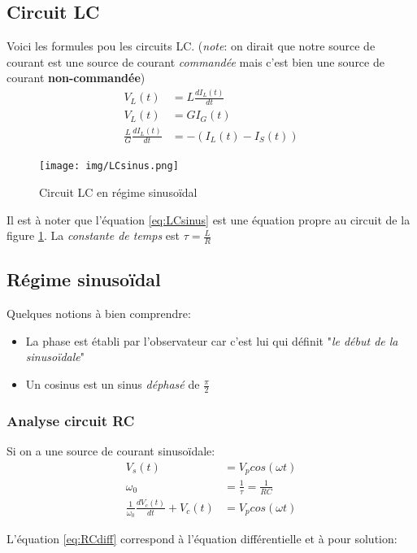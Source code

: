 \documentclass{report}
\begin{document}
\subsection{Circuit LC}
Voici les formules pou les circuits LC. (\textit{note}: on dirait que notre source de courant est une source de courant \textit{commandée} mais c'est bien une source de courant \textbf{non-commandée})
\begin{align}
V_L(t) &= L \frac{dI_L(t)}{dt}\\
V_L(t) &= GI_G(t)\\
\frac{L}{G} \frac{dI_L(t)}{dt} &= -(I_L(t)-I_S(t))\label{eq:LCsinus}
\end{align}

\begin{figure}[H]
\centering
\texttt{[image: img/LCsinus.png]} \label{img:LCsinus}
\caption{Circuit LC en régime sinusoïdal}
\end{figure}

Il est à noter que l'équation \ref{eq:LCsinus} est une équation propre au circuit de la figure \ref{img:LCsinus}. La \textit{constante de temps} est $\tau = \frac{L}{R}$

\subsection{Régime sinusoïdal}
Quelques notions à bien comprendre:
\begin{itemize}
\item La phase est établi par l'observateur car c'est lui qui définit "\textit{le début de la sinusoïdale}"
\item Un cosinus est un sinus \textit{déphasé} de $\frac{\pi}{2}$
\end{itemize}

\subsubsection{Analyse circuit RC}
Si on a une source de courant sinusoïdale:
\begin{align}
V_s(t) &= V_p cos(\omega t)\\
\omega_0 &= \frac{1}{\tau} = \frac{1}{RC}\\
\frac{1}{\omega_0}\frac{dV_c(t)}{dt} + V_c(t) &= V_p cos(\omega t) \label{eq:RCdiff}
\end{align}

L'équation \ref{eq:RCdiff} correspond à l'équation différentielle et à pour solution:
\end{document}
